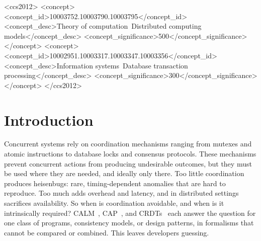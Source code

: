 \documentclass[sigconf]{cidr-2027}
\theoremstyle{remark}
\begin{document}
\begin{CCSXML}
<ccs2012>
<concept>
<concept_id>10003752.10003790.10003795</concept_id>
<concept_desc>Theory of computation~Distributed computing models</concept_desc>
<concept_significance>500</concept_significance>
</concept>
<concept>
<concept_id>10002951.10003317.10003347.10003356</concept_id>
<concept_desc>Information systems~Database transaction processing</concept_desc>
<concept_significance>300</concept_significance>
</concept>
</ccs2012>
\end{CCSXML}


\maketitle
{}\par\medskip


\section{Introduction}
\label{sec:intro}

\textcolor{reviewed}{Concurrent systems rely on coordination mechanisms ranging from mutexes and
atomic instructions to database locks and consensus protocols.} \textcolor{reviewed}{These mechanisms
prevent concurrent actions from producing undesirable outcomes, but they must be
used where they are needed, and ideally only there.} \textcolor{reviewed}{Too little coordination
produces heisenbugs: rare, timing-dependent anomalies that are hard to
reproduce.} \textcolor{reviewed}{Too much adds overhead and latency, and in distributed settings
sacrifices availability.} \textcolor{reviewed}{So when is coordination avoidable, and when is it
intrinsically required?} \textcolor{reviewed}{CALM~\cite{ameloot2013relational},
CAP~\cite{gilbert2002cap}, and CRDTs~\cite{shapiro2011crdt} each answer the
question for one class of programs, consistency models, or design patterns, in
formalisms that cannot be compared or combined.} \textcolor{reviewed}{This leaves developers
guessing.}
\end{document}
